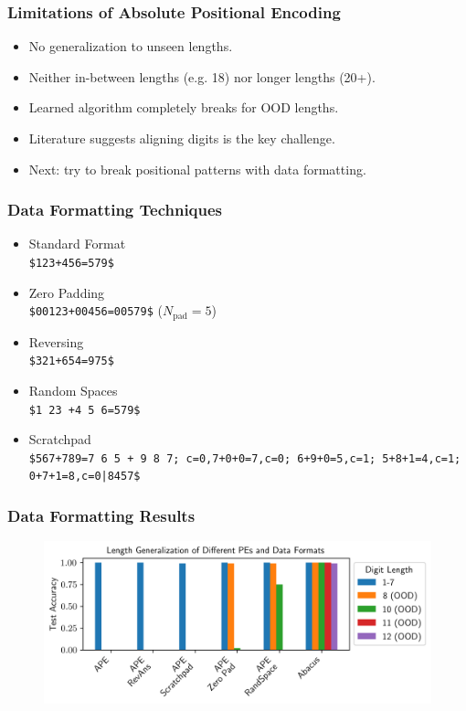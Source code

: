 \documentclass[14pt,aspectratio=169]{beamer}
\theoremstyle{remark}
\begin{document}
\begin{frame}
    \frametitle{Limitations of Absolute Positional Encoding}
    \begin{itemize}
        \item No generalization to unseen lengths.
        \item Neither in-between lengths (e.g. 18) nor longer lengths (20+).
        \item Learned algorithm completely breaks for OOD lengths.
        \item Literature suggests aligning digits is the key challenge.
        \item Next: try to break positional patterns with data formatting.
    \end{itemize}
\end{frame}

\begin{frame}
    \frametitle{Data Formatting Techniques}
    \begin{itemize}
        \item Standard Format \\
              \texttt{\$123+456=579\$}
        \item Zero Padding \\
              \texttt{\$00123+00456=00579\$} ($N_{\text{pad}} = 5$)
        \item Reversing \\
              \texttt{\$321+654=975\$}
        \item Random Spaces \\
              \texttt{\$1 23 +4  5 6=579\$}
        \item Scratchpad \\
              \texttt{\$567+789=7 6 5 + 9 8 7;
                  c=0,7+0+0=7,c=0;
                  6+9+0=5,c=1;
                  5+8+1=4,c=1;
                  0+7+1=8,c=0|8457\$}
    \end{itemize}
\end{frame}

\begin{frame}
    \frametitle{Data Formatting Results}
    \begin{figure}
        \centering
        \includegraphics[width=0.85\linewidth]{fig/pe_results.png}
    \end{figure}
\end{frame}
\end{document}
